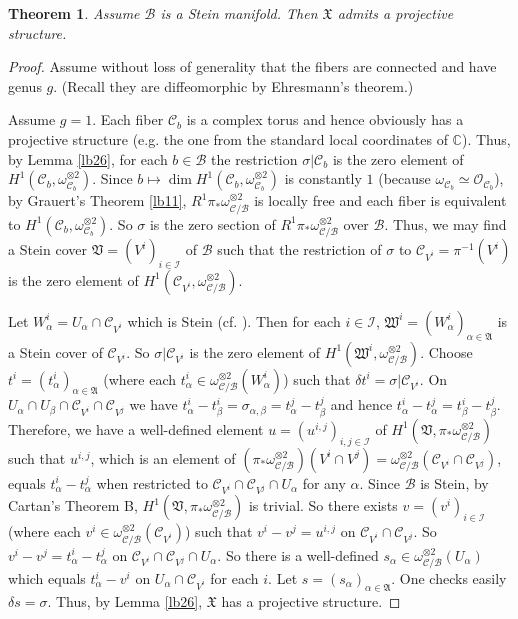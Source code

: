\documentclass[12pt,a4paper,notitlepage]{article}
\theoremstyle{definition}
\theoremstyle{plain}
\newtheorem{thm}[df]{Theorem}
\newcommand{\fk}{\mathfrak}
\newcommand{\mc}{\mathcal}
\newcommand{\scr}{\mathscr}
\newcommand{\mbb}{\mathbb}
\numberwithin{equation}{section}
\begin{document}
\begin{thm}\label{lb40}
	Assume $\mc B$ is a Stein manifold. Then $\fk X$ admits a projective structure.
\end{thm}


\begin{proof}
Assume without loss of generality that the fibers are connected and have genus $g$. (Recall they are diffeomorphic by Ehresmann's theorem.) 
	
Assume $g=1$. Each fiber $\mc C_b$ is a complex torus and hence obviously has a projective structure (e.g. the one from the standard local coordinates of $\mbb C$). Thus, by Lemma \ref{lb26}, for each $b\in\mc B$ the restriction $\sigma|\mc C_b$ is the zero element of $H^1(\mc C_b,\omega_{\mc C_b}^{\otimes 2})$. Since $b\mapsto \dim H^1(\mc C_b,\omega_{\mc C_b}^{\otimes 2})$ is constantly $1$ (because $\omega_{\mc C_b}\simeq \scr O_{\mc C_b}$), by Grauert's Theorem \ref{lb11}, $R^1\pi_*\omega_{\mc C/\mc B}^{\otimes 2}$ is locally free and each fiber is equivalent to $H^1(\mc C_b,\omega_{\mc C_b}^{\otimes 2})$. So $\sigma$ is the zero section of $R^1\pi_*\omega_{\mc C/\mc B}^{\otimes 2}$ over $\mc B$. Thus, we may find a Stein cover $\fk V=(V^i)_{i\in\mc I}$ of $\mc B$ such that  the restriction of $\sigma$ to $\mc C_{V^i}=\pi^{-1}(V^i)$ is the zero element of $H^1(\mc C_{V^i},\omega_{\mc C/\mc B}^{\otimes 2})$.
	
Let $W_\alpha^i=U_\alpha\cap \mc C_{V^i}$ which is Stein (cf. \cite[Sec. 1.4.4]{GR84}). Then for each $i\in\mc I$, $\fk W^i=(W_\alpha^i)_{\alpha\in\fk A}$ is a Stein cover of $\mc C_{V^i}$.  So $\sigma|\mc C_{V^i}$ is the zero element of  $H^1(\fk W^i,\omega_{\mc C/\mc B}^{\otimes 2})$. Choose $t^i=(t^i_\alpha)_{\alpha\in\fk A}$ (where each $t^i_\alpha\in\omega_{\mc C/\mc B}^{\otimes 2}(W_\alpha^i)$) such that $\delta t^i=\sigma|\mc C_{V^i}$. On $U_\alpha\cap U_\beta\cap \mc C_{V^i}\cap \mc C_{V^j}$ we have $t^i_\alpha-t^i_\beta=\sigma_{\alpha,\beta}=t^j_\alpha-t^j_\beta$ and hence $t^i_\alpha-t^j_\alpha=t^i_\beta-t^j_\beta$. Therefore, we have a well-defined element $u=(u^{i,j})_{i,j\in\mc I}$ of $H^1(\fk V,\pi_*\omega_{\mc C/\mc B}^{\otimes 2})$ such that $u^{i,j}$, which is an element of $(\pi_*\omega_{\mc C/\mc B}^{\otimes 2})(V^i\cap V^j)=\omega_{\mc C/\mc B}^{\otimes 2}(\mc C_{V^i}\cap \mc C_{V^j})$, equals $t^i_\alpha-t^j_\alpha$ when restricted to $\mc C_{V^i}\cap \mc C_{V^j}\cap U_\alpha$ for  any $\alpha$. Since $\mc B$ is Stein, by Cartan's Theorem B,  $H^1(\fk V,\pi_*\omega_{\mc C/\mc B}^{\otimes 2})$ is trivial. So there exists $v=(v^i)_{i\in\mc I}$ (where each $v^i\in \omega_{\mc C/\mc B}^{\otimes 2}(\mc C_{V^i})$) such that $v^i-v^j=u^{i,j}$ on $\mc C_{V^i}\cap \mc C_{V^j}$. So $v^i-v^j=t^i_\alpha-t^j_\alpha$ on $\mc C_{V^i}\cap \mc C_{V^j}\cap U_\alpha$. So there is a well-defined $s_\alpha\in\omega_{\mc C/\mc B}^{\otimes 2}(U_\alpha)$ which equals $t^i_\alpha-v^i$ on  $U_\alpha\cap \mc C_{V^i}$ for each $i$. Let $s=(s_\alpha)_{\alpha\in\fk A}$. One checks easily $\delta s=\sigma$. Thus, by Lemma \ref{lb26}, $\fk X$ has a projective structure.
	

\end{proof}
\end{document}
